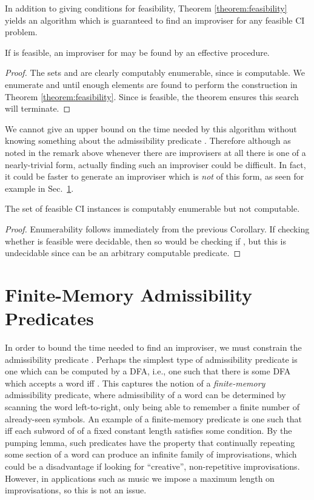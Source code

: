 \documentclass[a4paper,USenglish,numberwithinsect]{lipics}
\theoremstyle{plain}
\theoremstyle{definition}
\begin{document}
In addition to giving conditions for feasibility, Theorem \ref{theorem:feasibility} yields an algorithm which is guaranteed to find an improviser for any feasible CI problem.

\begin{corollary}
If  is feasible, an improviser for  may be found by an effective procedure.
\end{corollary}
\begin{proof}
The sets  and  are clearly computably enumerable, since  is computable. We enumerate  and  until enough elements are found to perform the construction in Theorem \ref{theorem:feasibility}. Since  is feasible, the theorem ensures this search will terminate.
\end{proof}

We cannot give an upper bound on the time needed by this algorithm without knowing something about the admissibility predicate . Therefore although as noted in the remark above whenever there are improvisers at all there is one of a nearly-trivial form, actually finding such an improviser could be difficult. In fact, it could be faster to generate an improviser which is \emph{not} of this form, as seen for example in Sec.~\ref{section:finite-memory}.

\begin{corollary}
The set of feasible CI instances is computably enumerable but not computable.
\end{corollary}
\begin{proof}
Enumerability follows immediately from the previous Corollary. If checking whether  is feasible were decidable, then so would be checking if , but this is undecidable since  can be an arbitrary computable predicate.
\end{proof}

\section{Finite-Memory Admissibility Predicates} \label{section:finite-memory}

In order to bound the time needed to find an improviser, we must
constrain the admissibility predicate . Perhaps the simplest
type of admissibility predicate is one which can be computed by a DFA,
i.e., one such that there is some DFA  which accepts a
word  iff . This captures the notion of
a \emph{finite-memory} admissibility predicate, where admissibility of
a word can be determined by scanning the word left-to-right, only
being able to remember a finite number of already-seen symbols. An
example of a finite-memory predicate  is one 
such that  iff each subword of 
of a fixed constant length satisfies some condition. By the
pumping lemma, such predicates have the property that continually
repeating some section of a word can produce an infinite family of
improvisations, which could be a disadvantage if looking for
``creative'', non-repetitive improvisations. However, in applications
such as music we impose a maximum length on improvisations, so this is
not an issue. 
\end{document}
